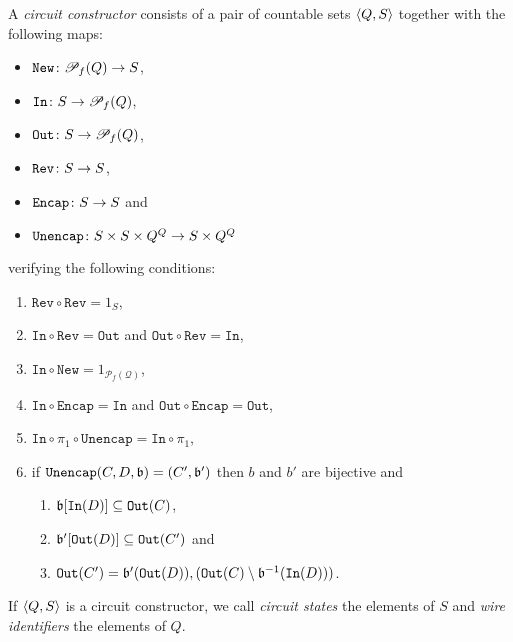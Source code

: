 \documentclass[twoside]{article}
\begin{document}
\begin{definition}
\label{circuit_constructor}
A \emph{circuit constructor} consists of a pair of countable sets $\langle Q,S\rangle$ 
together with the following maps:
\begin{itemize}
  \item $\mathtt{New}\colon {\mathscr{P}}_f(Q) \to S$,
  \item $\mathtt{In}\colon S\to {\mathscr{P}}_f(Q)$,
  \item $\mathtt{Out}\colon S\to {\mathscr{P}}_f(Q)$,
  \item $\mathtt{Rev}\colon S \to S$,
  \item $\mathtt{Encap}\colon S \to  S$ and
  \item $\mathtt{Unencap}\colon S\times S\times Q^Q \to S \times Q^Q$
\end{itemize}
verifying the following conditions:
\begin{enumerate}
  \item $\mathtt{Rev}\circ\mathtt{Rev}=1_S$,
  \item $\mathtt{In}\circ\mathtt{Rev}= \mathtt{Out}$ and 
        $\mathtt{Out}\circ\mathtt{Rev}= \mathtt{In}$\label{in_out_rev},
  \item $\mathtt{In}\circ\mathtt{New} =1_{\mathcal{P}_f(\mathcal{Q})}$,
  \item $\mathtt{In}\circ \mathtt{Encap} =\mathtt{In}$ and $\mathtt{Out}\circ \mathtt{Encap} =\mathtt{Out}$,
  \item $\mathtt{In}\circ\pi_1\circ\mathtt{Unencap}=\mathtt{In}\circ\pi_1$,\label{Unencap_In}
  \item if $\mathtt{Unencap} (C,D,\mathfrak{b})=(C',\mathfrak{b}')$ then $b$ and $b'$ are bijective and\label{Unencap_cond}
    \begin{enumerate}
      \item $\mathfrak{b}[\mathtt{In}(D)]\subseteq \mathtt{Out} (C)$,\label{Unencap_cond_1}
      \item $\mathfrak{b}'[\mathtt{Out}(D)]\subseteq\mathtt{Out}(C')$ and\label{Unencap_cond_2}
      \item $\mathtt{Out}(C')=\mathfrak{b}'(\mathtt{Out}(D)),(\mathtt{Out}(C)\setminus\mathfrak{b}^{-1}(\mathtt{In}(D)))$.\label{Unencap_cond_3}
    \end{enumerate}
\end{enumerate}
\end{definition}

If $\langle Q,S\rangle$ is a circuit constructor, we call \emph{circuit states} 
the elements of $S$ and \emph{wire identifiers} the elements of $Q$. 
\end{document}

